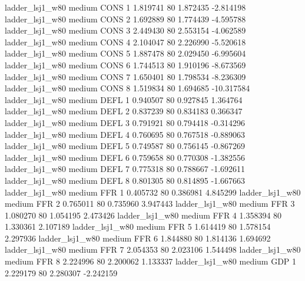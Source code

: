     ladder_lsj1_w80     medium     CONS                 1  1.819741 80       1.872435          -2.814198
    ladder_lsj1_w80     medium     CONS                 2  1.692889 80       1.774439          -4.595788
    ladder_lsj1_w80     medium     CONS                 3  2.449430 80       2.553154          -4.062589
    ladder_lsj1_w80     medium     CONS                 4  2.104047 80       2.226990          -5.520618
    ladder_lsj1_w80     medium     CONS                 5  1.887478 80       2.029450          -6.995604
    ladder_lsj1_w80     medium     CONS                 6  1.744513 80       1.910196          -8.673569
    ladder_lsj1_w80     medium     CONS                 7  1.650401 80       1.798534          -8.236309
    ladder_lsj1_w80     medium     CONS                 8  1.519834 80       1.694685         -10.317584
    ladder_lsj1_w80     medium     DEFL                 1  0.940507 80       0.927845           1.364764
    ladder_lsj1_w80     medium     DEFL                 2  0.837239 80       0.834183           0.366347
    ladder_lsj1_w80     medium     DEFL                 3  0.791921 80       0.794418          -0.314296
    ladder_lsj1_w80     medium     DEFL                 4  0.760695 80       0.767518          -0.889063
    ladder_lsj1_w80     medium     DEFL                 5  0.749587 80       0.756145          -0.867269
    ladder_lsj1_w80     medium     DEFL                 6  0.759658 80       0.770308          -1.382556
    ladder_lsj1_w80     medium     DEFL                 7  0.775318 80       0.788667          -1.692611
    ladder_lsj1_w80     medium     DEFL                 8  0.801305 80       0.814895          -1.667663
    ladder_lsj1_w80     medium      FFR                 1  0.405732 80       0.386981           4.845299
    ladder_lsj1_w80     medium      FFR                 2  0.765011 80       0.735960           3.947443
    ladder_lsj1_w80     medium      FFR                 3  1.080270 80       1.054195           2.473426
    ladder_lsj1_w80     medium      FFR                 4  1.358394 80       1.330361           2.107189
    ladder_lsj1_w80     medium      FFR                 5  1.614419 80       1.578154           2.297936
    ladder_lsj1_w80     medium      FFR                 6  1.844880 80       1.814136           1.694692
    ladder_lsj1_w80     medium      FFR                 7  2.054353 80       2.023106           1.544498
    ladder_lsj1_w80     medium      FFR                 8  2.224996 80       2.200062           1.133337
    ladder_lsj1_w80     medium      GDP                 1  2.229179 80       2.280307          -2.242159
